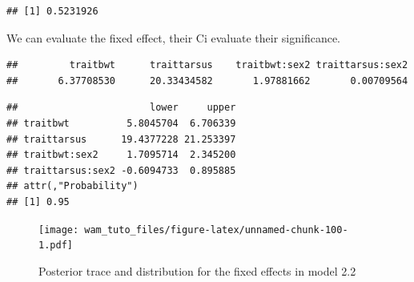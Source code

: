 \documentclass[
  12pt,
]{book}
\newenvironment{Shaded}{\begin{snugshade}}{\end{snugshade}}
\newcommand{\DecValTok}[1]{\textcolor[rgb]{0.00,0.00,0.81}{#1}}
\newcommand{\FloatTok}[1]{\textcolor[rgb]{0.00,0.00,0.81}{#1}}
\newcommand{\KeywordTok}[1]{\textcolor[rgb]{0.13,0.29,0.53}{\textbf{#1}}}
\newcommand{\NormalTok}[1]{#1}
\newcommand{\OperatorTok}[1]{\textcolor[rgb]{0.81,0.36,0.00}{\textbf{#1}}}
\newcommand{\StringTok}[1]{\textcolor[rgb]{0.31,0.60,0.02}{#1}}
\begin{document}
\begin{Shaded}
\end{Shaded}

\begin{verbatim}
## [1] 0.5231926
\end{verbatim}

We can evaluate the fixed effect, their Ci evaluate their significance.

\begin{Shaded}
\end{Shaded}

\begin{verbatim}
##         traitbwt      traittarsus    traitbwt:sex2 traittarsus:sex2 
##       6.37708530      20.33434582       1.97881662       0.00709564
\end{verbatim}

\begin{Shaded}
\end{Shaded}

\begin{verbatim}
##                       lower     upper
## traitbwt          5.8045704  6.706339
## traittarsus      19.4377228 21.253397
## traitbwt:sex2     1.7095714  2.345200
## traittarsus:sex2 -0.6094733  0.895885
## attr(,"Probability")
## [1] 0.95
\end{verbatim}

\begin{Shaded}
\end{Shaded}

\begin{figure}
\centering
\texttt{[image: wam\_tuto\_files/figure-latex/unnamed-chunk-100-1.pdf]}
\caption{\label{fig:unnamed-chunk-100}Posterior trace and distribution for the fixed effects in model 2.2}
\end{figure}
\end{document}
